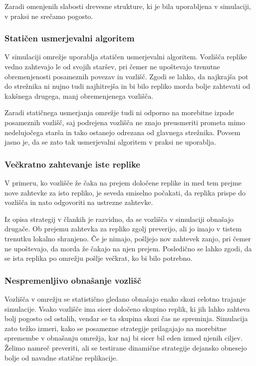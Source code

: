\documentclass[a4paper, 12pt]{book}
\begin{document}
Zaradi omenjenih slabosti drevesne strukture, ki je bila uporabljena v
simulaciji, v praksi ne srečamo pogosto.

\subsubsection{Statičen usmerjevalni algoritem}

V simulaciji omrežje uporablja statičen usmerjevalni algoritem. Vozlišča
replike vedno zahtevajo le od svojih staršev, pri čemer ne upoštevajo trenutne
obremenjenosti posameznih povezav in vozlišč. Zgodi se lahko, da
najkrajša pot do strežnika ni nujno tudi najhitrejša in bi bilo repliko morda
bolje zahtevati od kakšnega drugega, manj obremenjenega vozlišča.

Zaradi statičnega usmerjanja omrežje tudi ni odporno na morebitne izpade
posameznih vozlišč, saj podrejena vozlišča ne znajo preusmeriti prometa mimo
nedelujočega starša in tako ostanejo odrezana od glavnega strežnika. Povsem
jasno je, da se zato tak usmerjevalni algoritem v praksi ne uporablja.

\subsubsection{Večkratno zahtevanje iste replike}

V primeru, ko vozlišče že čaka na prejem določene replike in med tem prejme nove
zahtevke za isto repliko, je seveda smiselno počakati, da replika prispe do
vozlišča in nato odgovoriti na ustrezne zahtevke.

Iz opisa strategij v člankih je razvidno, da se vozlišča v simulaciji obnašajo
drugače. Ob prejemu zahtevka za repliko zgolj preverijo, ali jo imajo v tistem
trenutku lokalno shranjeno. Če je nimajo, pošljejo nov zahtevek zanjo, pri čemer
ne upoštevajo, da morda že čakajo na njen prejem. Posledično se lahko zgodi,
da se ista replika po omrežju pošlje večkrat, ko bi bilo potrebno.

\subsubsection{Nespremenljivo obnašanje vozlišč}

Vozlišča v omrežju se statistično gledano obnašajo enako skozi celotno trajanje
simulacije. Vsako vozlišče ima sicer določeno skupino replik, ki jih
lahko zahteva bolj pogosto od ostalih, vendar se ta skupina skozi čas ne
spreminja. Simulacija zato težko izmeri, kako se posamezne strategije
prilagajajo na morebitne spremembe v obnašanju omrežja, kar naj bi sicer bil
eden izmed njenih ciljev. Želimo namreč preveriti, ali se testirane dinamične
strategije dejansko obnesejo bolje od navadne statične replikacije.
\end{document}
